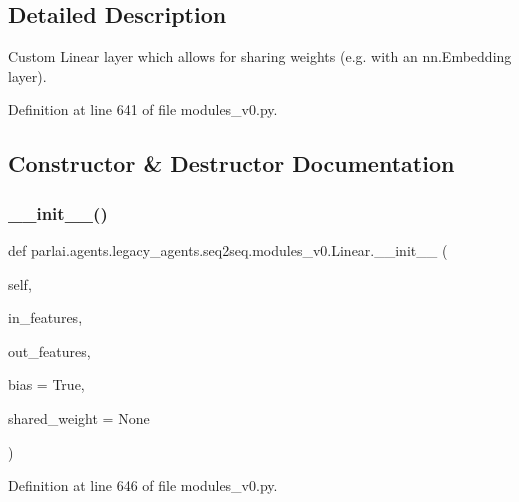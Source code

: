 \subsection{Detailed Description}
\begin{DoxyVerb}Custom Linear layer which allows for sharing weights (e.g. with an
nn.Embedding layer).
\end{DoxyVerb}
 

Definition at line 641 of file modules\+\_\+v0.\+py.



\subsection{Constructor \& Destructor Documentation}
\mbox{\label{classparlai_1_1agents_1_1legacy__agents_1_1seq2seq_1_1modules__v0_1_1Linear_a961944a7bcebe7bee8c32967e505994d}} 
\subsubsection{\texorpdfstring{\+\_\+\+\_\+init\+\_\+\+\_\+()}{\_\_init\_\_()}}
{\footnotesize\ttfamily def parlai.\+agents.\+legacy\+\_\+agents.\+seq2seq.\+modules\+\_\+v0.\+Linear.\+\_\+\+\_\+init\+\_\+\+\_\+ (\begin{DoxyParamCaption}\item[{}]{self,  }\item[{}]{in\+\_\+features,  }\item[{}]{out\+\_\+features,  }\item[{}]{bias = {\ttfamily True},  }\item[{}]{shared\+\_\+weight = {\ttfamily None} }\end{DoxyParamCaption})}



Definition at line 646 of file modules\+\_\+v0.\+py.



